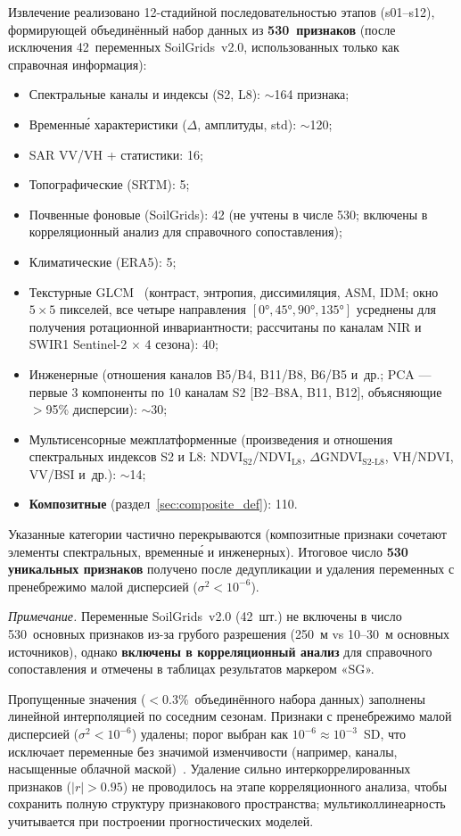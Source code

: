 Извлечение реализовано 12-стадийной последовательностью этапов (s01--s12), формирующей объединённый набор данных из \textbf{530~признаков} (после исключения 42~переменных SoilGrids~v2.0, использованных только как справочная информация):
\begin{itemize}[nosep]
  \item Спектральные каналы и индексы (S2, L8): $\sim$164 признака;
  \item Временны\'{е} характеристики ($\Delta$, амплитуды, std): $\sim$120;
  \item SAR VV/VH + статистики: 16;
  \item Топографические (SRTM): 5;
  \item Почвенные фоновые (SoilGrids): 42 (не учтены в числе 530; включены в корреляционный анализ для справочного сопоставления);
  \item Климатические (ERA5): 5;
  \item Текстурные GLCM~\citep{Haralick1973} (контраст, энтропия, диссимиляция, ASM, IDM; окно $5\times5$ пикселей, все четыре направления $[0°, 45°, 90°, 135°]$ усреднены для получения ротационной инвариантности; рассчитаны по каналам NIR и SWIR1 Sentinel-2 $\times$ 4 сезона): 40;
  \item Инженерные (отношения каналов B5/B4, B11/B8, B6/B5 и~др.; PCA --- первые 3 компоненты по 10 каналам S2 [B2--B8A, B11, B12], объясняющие $>$95\% дисперсии): $\sim$30;
  \item Мультисенсорные межплатформенные (произведения и отношения спектральных индексов S2 и L8: NDVI$_{\text{S2}}$/NDVI$_{\text{L8}}$, $\Delta$GNDVI$_{\text{S2-L8}}$, VH/NDVI, VV/BSI и~др.): $\sim$14;
  \item \textbf{Композитные} (раздел~\ref{sec:composite_def}): 110.
\end{itemize}

\noindent Указанные категории частично перекрываются (композитные признаки сочетают элементы спектральных, временны\'{е} и инженерных). Итоговое число \textbf{530 уникальных признаков} получено после дедупликации и удаления переменных с пренебрежимо малой дисперсией ($\sigma^2 < 10^{-6}$).

\noindent\textit{Примечание.} Переменные SoilGrids~v2.0 (42~шт.) не включены в число 530~основных признаков из-за грубого разрешения (250~м vs 10--30~м основных источников), однако \textbf{включены в корреляционный анализ} для справочного сопоставления и отмечены в таблицах результатов маркером «SG».

Пропущенные значения ($<$0.3\%~объединённого набора данных) заполнены линейной интерполяцией по соседним сезонам. Признаки с пренебрежимо малой дисперсией ($\sigma^2 < 10^{-6}$) удалены; порог выбран как $10^{-6} \approx 10^{-3}$~SD, что исключает переменные без значимой изменчивости (например, каналы, насыщенные облачной маской)~\citep{ViscarraRossel2006}. Удаление сильно интеркоррелированных признаков ($|r| > 0.95$) не проводилось на этапе корреляционного анализа, чтобы сохранить полную структуру признакового пространства; мультиколлинеарность учитывается при построении прогностических моделей.

